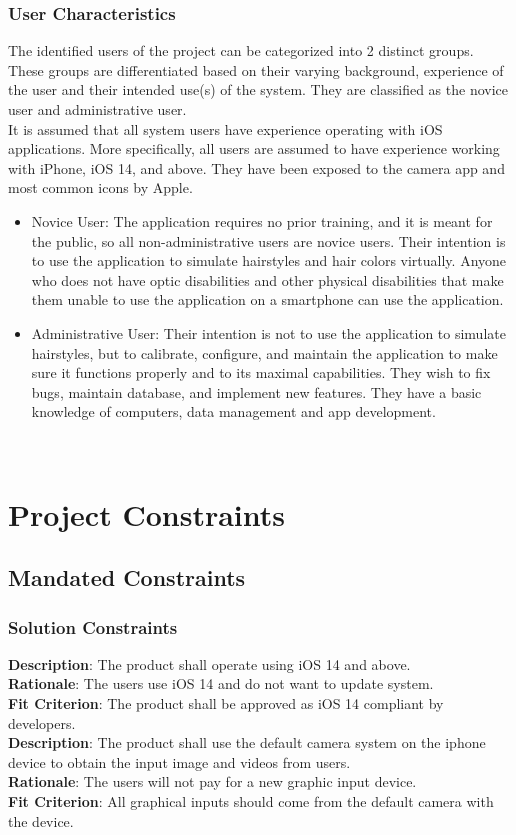 \documentclass[12pt]{article}
\begin{document}
\subsubsection{User Characteristics}
The identified users of the project can be categorized into 2 distinct groups. These groups are differentiated based on their varying background, experience of the user and their intended use(s) of the system. They are classified as the novice user and administrative user. \\
\newline
\noindent
It is assumed that all system users have experience operating with iOS applications. More specifically, all users are assumed to have experience working with iPhone, iOS 14, and above. They have been exposed to the camera app and most common icons by Apple.
\begin{itemize}
    \item Novice User: The application requires no prior training, and it is meant for the public, so all non-administrative users are novice users. Their intention is to use the application to simulate hairstyles and hair colors virtually. Anyone who does not have optic disabilities and other physical disabilities that make them unable to use the application on a smartphone can use the application.
    \item Administrative User: Their intention is not to use the application to simulate hairstyles, but to calibrate, configure, and maintain the application to make sure it functions properly and to its maximal capabilities. They wish to fix bugs, maintain database, and implement new features. They have a basic knowledge of computers, data management and app development.
    
\end{itemize}

~\newpage

\section{Project Constraints}
\subsection{Mandated Constraints}
\subsubsection{Solution Constraints}
\textbf{Description}: The product shall operate using iOS 14 and above. \\
\textbf{Rationale}: The users use iOS 14 and do not want to update system. \\
\textbf{Fit Criterion}: The product shall be approved as iOS 14 compliant by developers. \\
\newline
\textbf{Description}: The product shall use the default camera system on the iphone device to obtain the input image and videos from users. \\
\textbf{Rationale}: The users will not pay for a new graphic input device. \\
\textbf{Fit Criterion}: All graphical inputs should come from the default camera with the device. \\
\end{document}
